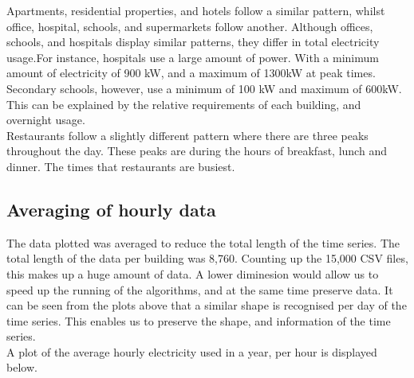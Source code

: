 \documentclass[12pt]{article}\usepackage[]{graphicx}\usepackage[]{color}
\makeatletter
\newenvironment{kframe}{%
 \def\at@end@of@kframe{}%
 \ifinner\ifhmode%
  \def\at@end@of@kframe{\end{minipage}}%
  \begin{minipage}{\columnwidth}%
 \fi\fi%
 \def\FrameCommand##1{\hskip\@totalleftmargin \hskip-\fboxsep
 \colorbox{shadecolor}{##1}\hskip-\fboxsep
     \hskip-\linewidth \hskip-\@totalleftmargin \hskip\columnwidth}%
 \MakeFramed {\advance\hsize-\width
   \@totalleftmargin\z@ \linewidth\hsize
   \@setminipage}}%
 {\par\unskip\endMakeFramed%
 \at@end@of@kframe}
\newenvironment{knitrout}{}{} %
\makeatother
\begin{document}
Apartments, residential properties, and hotels follow a similar pattern, whilst office, hospital, schools, and supermarkets follow another. Although offices, schools, and hospitals display similar patterns, they differ in total electricity usage.For instance, hospitals use a large amount of power. With a minimum amount of electricity of 900 kW, and a maximum of 1300kW at peak times. Secondary schools, however, use a minimum of 100 kW and maximum of 600kW. This can be explained by the relative requirements of each building, and overnight usage. \\

Restaurants follow a slightly different pattern where there are three peaks throughout the day. These peaks are during the hours of breakfast, lunch and dinner. The times that restaurants are busiest. \\


\subsection{Averaging of hourly data}

The data plotted was averaged to reduce the total length of the time series. The total length of the data per building was 8,760. Counting up the 15,000 CSV files, this makes up a huge amount of data. A lower diminesion would allow us to speed up the running of the algorithms, and at the same time preserve data. It can be seen from the plots above that a similar shape is recognised per day of the time series. This enables us to preserve the shape, and information of the time series. \\

A plot of the average hourly electricity used in a year, per hour is displayed below.

\begin{knitrout}
\color{fgcolor}\begin{kframe}


{\ttfamily\noindent\itshape\color{messagecolor}{\#\# Using avg\_elec\_p\_hour as value column: use value.var to override.}}\end{kframe}
\end{knitrout}
\end{document}
